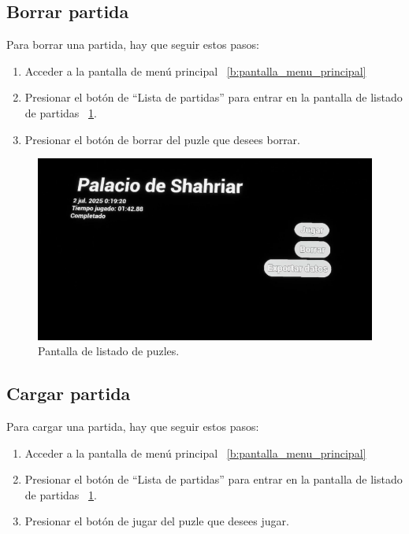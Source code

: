 \subsection{Borrar partida}
Para borrar una partida, hay que seguir estos pasos:
\begin{enumerate}
    \item Acceder a la pantalla de menú principal ~\ref{b:pantalla_menu_principal}
    \item Presionar el botón de  ``Lista de partidas'' para entrar en la pantalla de listado de partidas ~\ref{b:pantalla_listado_puzles}.
    \item Presionar el botón de borrar del puzle que desees borrar.
\end{enumerate}

\begin{figure}[h]
	\centering
	\includegraphics[width=\textwidth]{../img/anexos/pantalla_listado_puzles.png}
    \caption[Pantalla de listado de puzles]{Pantalla de listado de puzles.}
	\label{b:pantalla_listado_puzles}
\end{figure}

\subsection{Cargar partida}
Para cargar una partida, hay que seguir estos pasos:
\begin{enumerate}
    \item Acceder a la pantalla de menú principal ~\ref{b:pantalla_menu_principal}
    \item Presionar el botón de  ``Lista de partidas''  para entrar en la pantalla de listado de partidas ~\ref{b:pantalla_listado_puzles}.
    \item Presionar el botón de jugar del puzle que desees jugar.
\end{enumerate}

